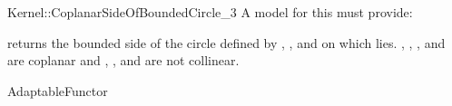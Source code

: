 \begin{ccRefFunctionObjectConcept}{Kernel::CoplanarSideOfBoundedCircle_3}
A model for this must provide:


         {returns the bounded side of the circle defined
          by , , and  on which  lies.
          \ccPrecond {}, , , and  are coplanar and
          , , and  are not collinear.}

\ccRefines
AdaptableFunctor

\ccSeeAlso
{}\\

\end{ccRefFunctionObjectConcept}

